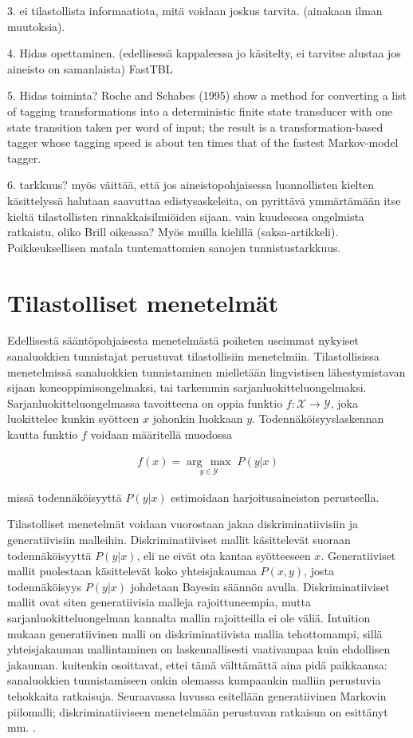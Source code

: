\documentclass[utf8,bachelor,manualbib]{gradu3}
\newcommand{\argmax}[1]{\underset{#1}{\operatorname{arg}\,\operatorname{max}}\;}
\begin{document}
3. ei tilastollista informaatiota, mitä voidaan joskus tarvita. (ainakaan ilman muutoksia).

4. Hidas opettaminen. (edellisessä kappaleessa jo käsitelty, ei tarvitse alustaa jos aineisto on samanlaista) FastTBL

5. Hidas toiminta? Roche and Schabes (1995) show a method for converting a list
of tagging transformations into a deterministic finite state transducer with one state
transition taken per word of input; the result is a transformation-based tagger whose
tagging speed is about ten times that of the fastest Markov-model tagger.

6. tarkkuus? \citet{brill1995} myös väittää, että jos aineistopohjaisessa luonnollisten kielten käsittelyssä halutaan saavuttaa edistysaskeleita, on pyrittävä ymmärtämään itse kieltä tilastollisten rinnakkaisilmiöiden sijaan. \citet{manning2011} vain kuudesosa ongelmista ratkaistu, oliko Brill oikeassa? Myös muilla kielillä (saksa-artikkeli). Poikkeuksellisen matala tuntemattomien sanojen tunnistustarkkuus.


\chapter{Tilastolliset menetelmät}

Edellisestä sääntöpohjaisesta menetelmästä poiketen useimmat nykyiset sanaluokkien tunnistajat perustuvat tilastollisiin menetelmiin. Tilastollisissa menetelmissä sanaluokkien tunnistaminen mielletään lingvistisen lähestymistavan sijaan koneoppimisongelmaksi, tai tarkemmin sarjanluokitteluongelmaksi. Sarjanluokitteluongelmassa tavoitteena on oppia funktio $f: \mathcal{X} \to \mathcal{Y}$, joka luokittelee kunkin syötteen $x$ johonkin luokkaan $y$. Todennäköisyyslaskennan kautta funktio $f$ voidaan määritellä muodossa

\begin{align}
f(x) = \argmax{y \in \mathcal{Y}} P(y|x)
\end{align}

missä todennäköisyyttä $P(y|x)$ estimoidaan harjoitusaineiston perusteella.

Tilastolliset menetelmät voidaan vuorostaan jakaa diskriminatiivisiin ja generatiivisiin malleihin. Diskriminatiiviset mallit käsittelevät suoraan todennäköisyyttä $P(y|x)$, eli ne eivät ota kantaa syötteeseen $x$. Generatiiviset mallit puolestaan käsittelevät koko yhteisjakaumaa $P(x,y)$, josta todennäköisyys $P(y|x)$ johdetaan Bayesin säännön avulla. Diskriminatiiviset mallit ovat siten generatiivisia malleja rajoittuneempia, mutta sarjanluokitteluongelman kannalta mallin rajoitteilla ei ole väliä. Intuition mukaan generatiivinen malli on diskriminatiivista mallia tehottomampi, sillä yhteisjakauman mallintaminen on laskennallisesti vaativampaa kuin ehdollisen jakauman. \citet{ng2002} kuitenkin osoittavat, ettei tämä välttämättä aina pidä paikkaansa: sanaluokkien tunnistamiseen onkin olemassa kumpaankin malliin perustuvia tehokkaita ratkaisuja. Seuraavassa luvussa esitellään generatiivinen Markovin piilomalli; diskriminatiiviseen menetelmään perustuvan ratkaisun on esittänyt mm. \citet{ratnaparkhi1996}.
\end{document}
